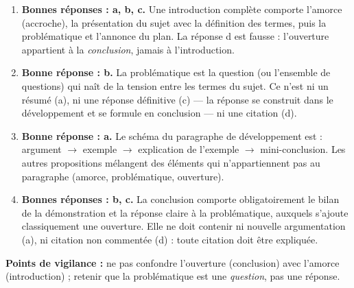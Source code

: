 \documentclass[11pt]{article}
\begin{document}
\begin{corrige}
\begin{enumerate}
\item \textbf{Bonnes réponses : a, b, c.} Une introduction complète comporte l'amorce (accroche), la présentation du sujet avec la définition des termes, puis la problématique et l'annonce du plan. La réponse d est fausse : l'ouverture appartient à la \emph{conclusion}, jamais à l'introduction.
\item \textbf{Bonne réponse : b.} La problématique est la question (ou l'ensemble de questions) qui naît de la tension entre les termes du sujet. Ce n'est ni un résumé (a), ni une réponse définitive (c) — la réponse se construit dans le développement et se formule en conclusion — ni une citation (d).
\item \textbf{Bonne réponse : a.} Le schéma du paragraphe de développement est : argument $\rightarrow$ exemple $\rightarrow$ explication de l'exemple $\rightarrow$ mini-conclusion. Les autres propositions mélangent des éléments qui n'appartiennent pas au paragraphe (amorce, problématique, ouverture).
\item \textbf{Bonnes réponses : b, c.} La conclusion comporte obligatoirement le bilan de la démonstration et la réponse claire à la problématique, auxquels s'ajoute classiquement une ouverture. Elle ne doit contenir ni nouvelle argumentation (a), ni citation non commentée (d) : toute citation doit être expliquée.
\end{enumerate}
\textbf{Points de vigilance :} ne pas confondre l'ouverture (conclusion) avec l'amorce (introduction) ; retenir que la problématique est une \emph{question}, pas une réponse.
\end{corrige}
\end{document}
